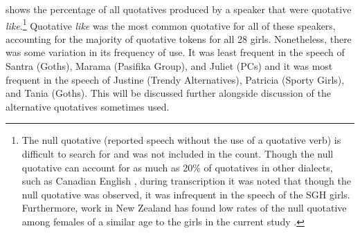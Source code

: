 \newpage
{} shows the percentage of all quotatives produced by a speaker that were quotative \textit{like}.\footnote{The null quotative (reported speech without the use of a quotative verb) is difficult to search for and was not included in the count. Though the null quotative can account for as much as 20\% of quotatives in other dialects, such as Canadian English \citep{tagliamontehudson1999}, during transcription it was noted that though the null quotative was observed, it was infrequent in the speech of the SGH girls. Furthermore, work in New Zealand has found low rates of the null quotative among females of a similar age to the girls in the current study \citep{buchstallerdarcy2009}.} Quotative \textit{like} was the most common quotative for all of these speakers, accounting for the majority of quotative tokens for all 28 girls. Nonetheless, there was some variation in its frequency of use. It was least frequent in the speech of Santra (Goths), Marama (Pasifika Group), and Juliet (PCs) and it was most frequent in the speech of Justine (Trendy Alternatives), Patricia (Sporty Girls), and Tania (Goths). This will be discussed further alongside discussion of the alternative quotatives sometimes used.



